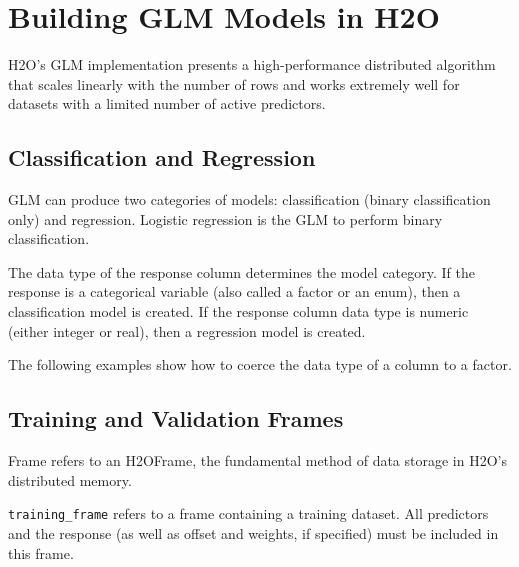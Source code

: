 %


\section{Building GLM Models in H2O}

H2O's GLM implementation presents a high-performance distributed algorithm that scales linearly with the number
of rows and works extremely well for datasets with a limited number of active predictors.

\subsection{Classification and Regression}

GLM can produce two categories of models: classification (binary classification only) and regression. Logistic regression is the GLM to perform binary classification.

The data type of the response column determines the model category.  If the response is a categorical variable
(also called a factor or an enum), then a classification model is created.  If the response column data type is
numeric (either integer or real), then a regression model is created. 

The following examples show how to coerce the data type of a column to a factor.

\waterExampleInR


\newpage
\waterExampleInPython


\subsection{Training and Validation Frames}

Frame refers to an H2OFrame, the fundamental method of data storage in H2O's distributed memory.

\texttt{training\_frame} refers to a frame containing a training dataset.  All predictors and the response (as
well as offset and weights, if specified) must be included in this frame.

